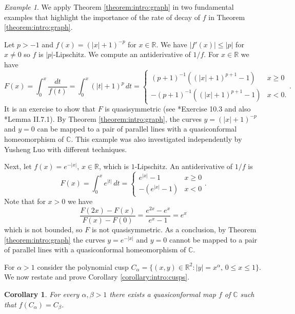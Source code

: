 \documentclass[letterpaper]{amsart}
\theoremstyle{plain}
\newtheorem{corollary}[theorem]{Corollary}
\theoremstyle{definition}
\theoremstyle{remark}
\newtheorem{example}[theorem]{Example}
\numberwithin{equation}{section}
\numberwithin{theorem}{section}
\newcommand{\R}{\mathbb R}
\newcommand{\C}{\mathbb C}
\begin{document}
\begin{example}\label{example:function}
We apply Theorem \ref{theorem:intro:graph} in two fundamental examples that highlight the importance of the rate of decay of $f$ in Theorem \ref{theorem:intro:graph}.

Let $p>-1$ and $f(x)=(|x|+1)^{-p}$ for $x\in \R$. We have $|f'(x)|\leq |p|$ for $x\neq 0$ so $f$ is $|p|$-Lipschitz. We compute an antiderivative of $1/f$. For $x\in \R$ we have
$$F(x)=\int_0^x \frac{dt}{f(t)}=\int_{0}^x (|t|+1)^p \, dt =\begin{cases}(p+1)^{-1}((|x|+1)^{p+1}-1) & x\geq 0\\
-(p+1)^{-1}((|x|+1)^{p+1}-1) & x<0.
\end{cases}.$$
It is an exercise to show that $F$ is quasisymmetric (see \cite{Heinonen:metric}*{Exercise 10.3} and also \cite{LehtoVirtanen:quasiconformal}*{Lemma II.7.1}). By Theorem \ref{theorem:intro:graph}, the curves $y=(|x|+1)^{-p}$ and $y=0$ can be mapped to a pair of parallel lines with a quasiconformal homeomorphism of $\C$.  This example was also investigated independently by Yusheng Luo with different techniques.

Next, let $f(x)=e^{-|x|}$, $x\in \R$, which is $1$-Lipschitz. An antiderivative of $1/f$ is
$$F(x)= \int_0^x e^{|t|}\, dt= \begin{cases}
e^{|x|}-1 & x\geq 0 \\
-(e^{|x|}-1) & x<0
\end{cases}.$$
Note that for $x>0$ we have
$$\frac{F(2x)-F(x)}{F(x)-F(0)}= \frac{e^{2x}-e^x}{e^x-1}=e^x$$
which is not bounded, so $F$ is not quasisymmetric. As a conclusion, by Theorem \ref{theorem:intro:graph} the curves $y=e^{-|x|}$ and $y=0$ cannot be mapped to a pair of parallel lines with a quasiconformal homeomorphism of $\C$.
\end{example}

For $\alpha>1$ consider the polynomial cusp $C_\alpha=\{(x,y)\in \R^2: |y|=x^\alpha, \, 0\leq x\leq 1\}$. We now restate and prove Corollary \ref{corollary:intro:cusps}.
\begin{corollary}
For every $\alpha,\beta>1$ there exists a quasiconformal map $f$ of $\C$ such that $f(C_\alpha)=C_\beta$. 
\end{corollary}
\end{document}
